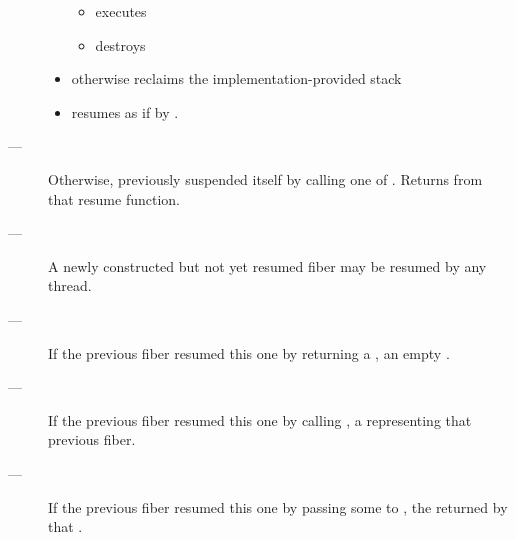 \begin{description}
\begin{itemize}
\begin{itemize}
                    \item executes 
                    \item destroys 
                \end{itemize}
            \item otherwise reclaims the implementation-provided stack
            \item resumes \continuation as if by .
        \end{itemize}
    \item[---] Otherwise,  previously
               suspended itself by calling one of \anyresume.
               Returns  from that resume function.
\end{description}

\remarks
\begin{description}
    \item[---] A newly constructed but not yet resumed fiber may be resumed by
              any thread.
\end{description}

\returns
\begin{description}
    \item[---] If the previous fiber resumed this one by returning a \fiber,
               an empty \fiber.
    \item[---] If the previous fiber resumed this one by calling \someresume,
               a \fiber representing that previous fiber.
    \item[---] If the previous fiber resumed this one by passing some 
               to \anyresumewith, the \fiber returned by that .
\end{description}

